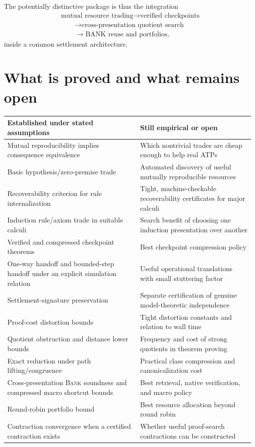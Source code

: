 \documentclass[11pt]{article}
\theoremstyle{definition}
\theoremstyle{remark}
\newcommand{\BANK}{\textsc{Bank}}
\begin{document}
The potentially distinctive package is thus the integration
\[
\begin{aligned}
&\text{mutual resource trading}\to\text{verified checkpoints}\\
&\qquad\to\text{cross-presentation quotient search}\\
&\qquad\to\text{BANK reuse and portfolios},
\end{aligned}
\]
inside a common settlement architecture.

\section{What is proved and what remains open}
\begin{center}
\begin{tabular}{p{}p{}}
\toprule
\textbf{Established under stated assumptions} & \textbf{Still empirical or open}\\
\midrule
Mutual reproducibility implies consequence equivalence & Which nontrivial trades are cheap enough to help real ATPs\\
Basic hypothesis/zero-premise trade & Automated discovery of useful mutually reproducible resources\\
Recoverability criterion for rule internalization & Tight, machine-checkable recoverability certificates for major calculi\\
Induction rule/axiom trade in suitable calculi & Search benefit of choosing one induction presentation over another\\
Verified and compressed checkpoint theorems & Best checkpoint compression policy\\
One-way handoff and bounded-step handoff under an explicit simulation relation & Useful operational translations with small stuttering factor\\
Settlement-signature preservation & Separate certification of genuine model-theoretic independence\\
Proof-cost distortion bounds & Tight distortion constants and relation to wall time\\
Quotient obstruction and distance lower bounds & Frequency and cost of strong quotients in theorem proving\\
Exact reduction under path lifting/congruence & Practical class compression and canonicalization cost\\
Cross-presentation \BANK{} soundness and compressed macro shortcut bounds & Best retrieval, native verification, and macro policy\\
Round-robin portfolio bound & Best resource allocation beyond round robin\\
Contraction convergence when a certified contraction exists & Whether useful proof-search contractions can be constructed\\
\bottomrule
\end{tabular}
\end{center}
\end{document}
